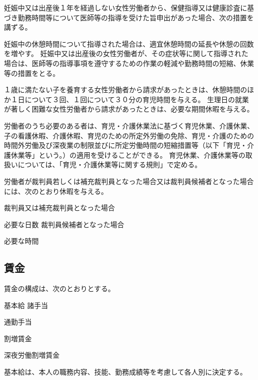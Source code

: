 \documentclass[10pt,a4paper]{jsarticle}
\begin{document}
\term
妊娠中又は出産後１年を経過しない女性労働者から、保健指導又は健康診査に基づき勤務時間等について医師等の指導を受けた旨申出があった場合、次の措置を講ずる。
\begin{enumerate}
    \itm 妊娠中の休憩時間について指導された場合は、適宜休憩時間の延長や休憩の回数を増やす。
    \itm 妊娠中又は出産後の女性労働者が、その症状等に関して指導された場合は、医師等の指導事項を遵守するための作業の軽減や勤務時間の短縮、休業等の措置をとる。
\end{enumerate}

１歳に満たない子を養育する女性労働者から請求があったときは、休憩時間のほか１日について３回、１回について３０分の育児時間を与える。
\term
生理日の就業が著しく困難な女性労働者から請求があったときは、必要な期間休暇を与える。

労働者のうち必要のある者は、育児・介護休業法に基づく育児休業、介護休業、子の看護休暇、介護休暇、育児のための所定外労働の免除、育児・介護のための時間外労働及び深夜業の制限並びに所定労働時間の短縮措置等（以下「育児・介護休業等」という。）の適用を受けることができる。
\term
育児休業、介護休業等の取扱いについては、「育児・介護休業等に関する規則」で定める。

労働者が裁判員若しくは補充裁判員となった場合又は裁判員候補者となった場合には、次のとおり休暇を与える。
\begin{enumerate}
    \itm 裁判員又は補充裁判員となった場合 \par 必要な日数
    \itm 裁判員候補者となった場合\par 必要な時間
\end{enumerate}


\subsection{賃金}

賃金の構成は、次のとおりとする。
\begin{enumerate}
    \itm 基本給
    \itm 諸手当
    \begin{enumerate}
        \itm 通勤手当
    \end{enumerate}
    \itm 割増賃金
    \begin{enumerate}
        \itm 深夜労働割増賃金
    \end{enumerate}
\end{enumerate}

基本給は、本人の職務内容、技能、勤務成績等を考慮して各人別に決定する。
\end{document}

